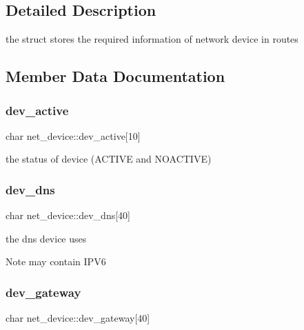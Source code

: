 \subsection{Detailed Description}
the struct stores the required information of network device in routes 

\subsection{Member Data Documentation}
\mbox{\label{structnet__device_a1759ef9f942f991bff24268b2fc90c59}} 
\subsubsection{\texorpdfstring{dev\+\_\+active}{dev\_active}}
{\footnotesize\ttfamily char net\+\_\+device\+::dev\+\_\+active\mbox{[}10\mbox{]}}



the status of device (A\+C\+T\+I\+VE and N\+O\+A\+C\+T\+I\+VE) 

\mbox{\label{structnet__device_ac9ae8e657fb43f5baafd0fafcee819fa}} 
\subsubsection{\texorpdfstring{dev\+\_\+dns}{dev\_dns}}
{\footnotesize\ttfamily char net\+\_\+device\+::dev\+\_\+dns\mbox{[}40\mbox{]}}



the dns device uses 

\begin{DoxyNote}{Note}
may contain I\+P\+V6 
\end{DoxyNote}
\mbox{\label{structnet__device_ad708824b9b388d466795dc764d6fc477}} 
\subsubsection{\texorpdfstring{dev\+\_\+gateway}{dev\_gateway}}
{\footnotesize\ttfamily char net\+\_\+device\+::dev\+\_\+gateway\mbox{[}40\mbox{]}}



